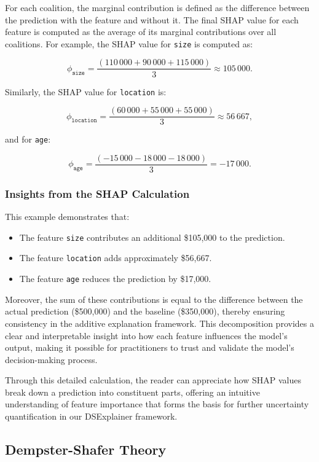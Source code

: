 \documentclass[acmlarge]{acmart}
\begin{document}
For each coalition, the marginal contribution is defined as the difference between the prediction with the feature and without it. The final SHAP value for each feature is computed as the average of its marginal contributions over all coalitions. For example, the SHAP value for \texttt{size} is computed as:

\[
\phi_{\texttt{size}} = \frac{(110\,000 + 90\,000 + 115\,000)}{3} \approx 105\,000.
\]

Similarly, the SHAP value for \texttt{location} is:

\[
\phi_{\texttt{location}} = \frac{(60\,000 + 55\,000 + 55\,000)}{3} \approx 56\,667,
\]

and for \texttt{age}:

\[
\phi_{\texttt{age}} = \frac{(-15\,000 - 18\,000 - 18\,000)}{3} = -17\,000.
\]

\subsubsection{Insights from the SHAP Calculation}

This example demonstrates that:
\begin{itemize}
    \item The feature \texttt{size} contributes an additional \$105,000 to the prediction.
    \item The feature \texttt{location} adds approximately \$56,667.
    \item The feature \texttt{age} reduces the prediction by \$17,000.
\end{itemize}

Moreover, the sum of these contributions is equal to the difference between the actual prediction (\$500,000) and the baseline (\$350,000), thereby ensuring consistency in the additive explanation framework. This decomposition provides a clear and interpretable insight into how each feature influences the model’s output, making it possible for practitioners to trust and validate the model’s decision-making process.

Through this detailed calculation, the reader can appreciate how SHAP values break down a prediction into constituent parts, offering an intuitive understanding of feature importance that forms the basis for further uncertainty quantification in our DSExplainer framework.


\subsection{Dempster-Shafer Theory}
\end{document}
